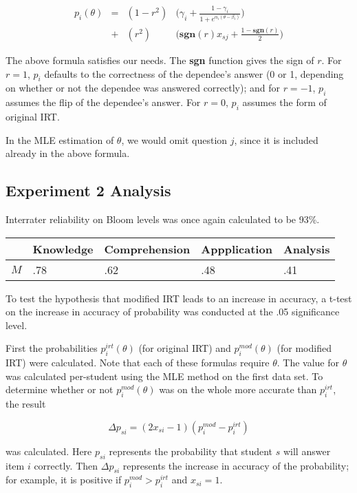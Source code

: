 \begin{align*}
  p_i(\theta) &=& (1-r^2) & \Big(\gamma_i + \frac{1-\gamma_i}{1+e^{\alpha_i(\theta-\beta_i)}}\Big) \\
              &+& (r^2)   & \Big(\mathbf{sgn}(r)x_{sj}+\frac{1-\mathbf{sgn}(r)}{2}\Big)
\end{align*}

The above formula satisfies our needs.  The \textbf{sgn} function gives the
sign of $r$.  For $r=1$, $p_i$ defaults to the correctness of the dependee's
answer (0 or 1, depending on whether or not the dependee was answered
correctly);  and for $r=-1$, $p_i$ assumes the flip of the dependee's answer.
For $r=0$, $p_i$ assumes the form of original IRT.  

In the MLE estimation of $\theta$, we would omit question $j$, since it is
included already in the above formula.


\subsection{Experiment 2 Analysis}

Interrater reliability on Bloom levels was once again calculated to be 93\%. 

\begin{center}
\begin{tabular}{|l|l|l|l|l|}
                                                                 \hline
      &   Knowledge & Comprehension & Appplication & Analysis \\ \hline
 $M$  &  .78 & .62 & .48 & .41  \\ \hline
\end{tabular}
\end{center}


To test the hypothesis that modified IRT leads to an increase in accuracy,
a t-test on the increase in accuracy of probability was conducted at the
.05 significance level.

First the probabilities $p_i^{irt}(\theta)$ (for original IRT) and
$p_i^{mod}(\theta)$ (for modified IRT) were calculated.  Note that each of
these formulas require $\theta$. The value for $\theta$ was calculated
per-student using the MLE method on the first data set.  To determine whether
or not $p_i^{mod}(\theta)$ was on the whole more accurate than $p_i^{irt}$, the
result

\[
  \Delta p_{si} = (2x_{si}-1) (p_i^{mod} - p_i^{irt})
\]

was calculated. Here $p_{si}$ represents the probability that student $s$ will
answer item $i$ correctly.  Then $\Delta p_{si}$ represents the increase in
accuracy of the probability; for example, it is positive if $p_i^{mod} >
p_i^{irt}$ and $x_{si} = 1$.

